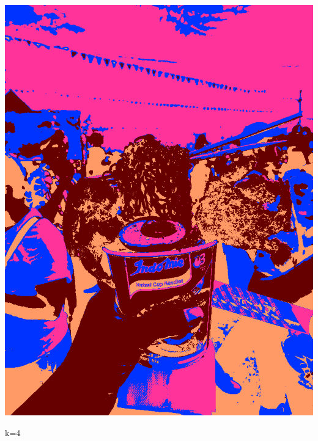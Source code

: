 \documentclass{article}
\begin{document}
\begin{newpage}
\begin{center}
\begin{minipage}{0.8\textwidth}
\begin{minipage}{0.3\linewidth}
            \centerline{\includegraphics[width=\textwidth]{src/ramen_c4_output.png}}
            \centerline{k=4}
        \end{minipage}\\
        \begin{center}
            \begin{minipage}{0.3\linewidth}
                \vspace{\gap}

\end{minipage}
\end{center}
\end{minipage}
\end{center}
\end{newpage}
\end{document}
